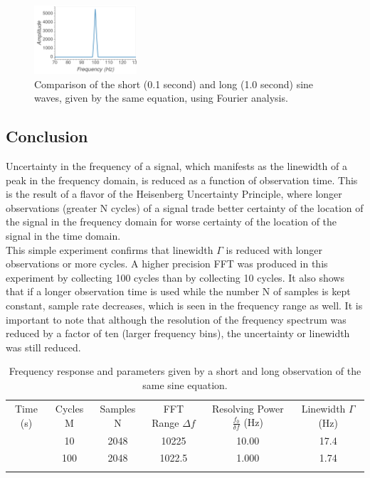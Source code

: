 \documentclass[aps,prl,reprint]{revtex4-2}
\begin{document}
\begin{figure}[h]
\includegraphics[width=0.34\textwidth]{../Images/l5_A_2b.png}
\caption{\label{comparisine_FD} Comparison of the short (0.1 second) and long
(1.0 second) sine waves, given by the same equation, using Fourier analysis.}
\end{figure}

\subsection{Conclusion}

Uncertainty in the frequency of a signal, which manifests as the linewidth
of a peak in the frequency domain, is reduced as a function of observation time.
This is the result of a flavor of the Heisenberg Uncertainty Principle, where 
longer observations (greater N cycles) of a signal trade better certainty of 
the location of the signal in the frequency domain for worse certainty of the 
location of the signal in the time domain. \\

This simple experiment confirms that linewidth $\Gamma$ is reduced with
longer observations or more cycles. A higher precision FFT was produced
in this experiment by collecting 100 cycles than by collecting 10 cycles.
It also shows that if a longer observation time is used while the number
N of samples is kept constant, sample rate decreases, which is seen in the
frequency range as well. It is important to note that although the 
resolution of the frequency spectrum was reduced by a factor of ten (larger frequency
bins), the uncertainty or linewidth was still reduced. 

\begin{widetext}
\begin{center}
\begin{table}[t]
\renewcommand{\arraystretch}{1}
\setlength{\tabcolsep}{10pt}
\caption{\label{comparisine_TB} Frequency response and parameters given by a
short and long observation of the same sine equation.}
\begin{tabular}{|c|c|c|c|c|c|}
\toprule
Time (s) & Cycles M & Samples N & FFT Range $\Delta f$ & Resolving Power $\frac{f_0}{\delta f}$ (Hz) & Linewidth $\Gamma$ (Hz) \\
\colrule
0.1  &  10   &  2048  &  10225   & 10.00 &  17.4 \\ \colrule
1.0  &  100  &  2048  &  1022.5  & 1.000 &  1.74 \\ \hline
\botrule
\end{tabular}
\end{table}
\end{center}
\end{widetext}
\end{document}
